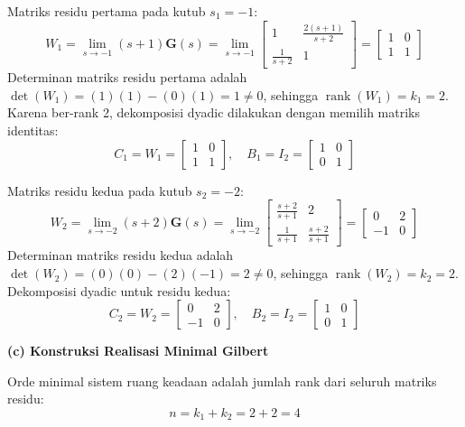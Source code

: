 \documentclass[11pt,a4paper]{article}
\begin{document}
Matriks residu pertama pada kutub $s_1 = -1$:
$$W_1 = \lim_{s \to -1} (s+1) \mathbf{G}(s) = \lim_{s \to -1} \begin{bmatrix} 1 & \frac{2(s+1)}{s+2} \\ \frac{1}{s+2} & 1 \end{bmatrix} = \begin{bmatrix} 1 & 0 \\ 1 & 1 \end{bmatrix}$$
Determinan matriks residu pertama adalah $\det(W_1) = (1)(1) - (0)(1) = 1 \neq 0$, sehingga $\operatorname{rank}(W_1) = k_1 = 2$.
Karena ber-rank 2, dekomposisi dyadic dilakukan dengan memilih matriks identitas:
$$C_1 = W_1 = \begin{bmatrix} 1 & 0 \\ 1 & 1 \end{bmatrix}, \quad B_1 = I_2 = \begin{bmatrix} 1 & 0 \\ 0 & 1 \end{bmatrix}$$

Matriks residu kedua pada kutub $s_2 = -2$:
$$W_2 = \lim_{s \to -2} (s+2) \mathbf{G}(s) = \lim_{s \to -2} \begin{bmatrix} \frac{s+2}{s+1} & 2 \\ \frac{1}{s+1} & \frac{s+2}{s+1} \end{bmatrix} = \begin{bmatrix} 0 & 2 \\ -1 & 0 \end{bmatrix}$$
Determinan matriks residu kedua adalah $\det(W_2) = (0)(0) - (2)(-1) = 2 \neq 0$, sehingga $\operatorname{rank}(W_2) = k_2 = 2$.
Dekomposisi dyadic untuk residu kedua:
$$C_2 = W_2 = \begin{bmatrix} 0 & 2 \\ -1 & 0 \end{bmatrix}, \quad B_2 = I_2 = \begin{bmatrix} 1 & 0 \\ 0 & 1 \end{bmatrix}$$

\textbf{(c) Konstruksi Realisasi Minimal Gilbert}

Orde minimal sistem ruang keadaan adalah jumlah rank dari seluruh matriks residu:
$$n = k_1 + k_2 = 2 + 2 = 4$$
\end{document}
